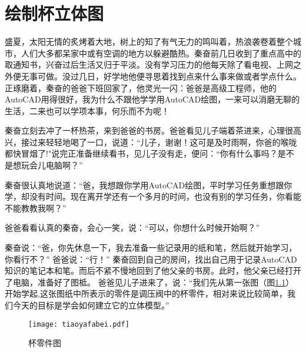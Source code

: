 \chapter{绘制杯立体图}\label{chap:bei}

盛夏，太阳无情的炙烤着大地，树上的知了有气无力的鸣叫着，热浪袭卷着整个城市，人们大多都呆家中或有空调的地方以躲避酷热。秦奋前几日收到了重点高中的取通知书，兴奋过后生活又归于平淡。没有学习压力的他每天除了看电视、上网之外便无事可做。没过几日，好学地他便寻思着找到点来什么事来做或者学点什么。正琢磨着，秦奋的爸爸下班回家了，他灵光一闪：爸爸是高级工程师，他的AutoCAD用得很好，我为什么不跟他学学用AutoCAD绘图，一来可以消磨无聊的生活，二来也可以学项本事，何乐而不为呢！

秦奋立刻去冲了一杯热茶，来到爸爸的书房。爸爸看见儿子端着茶进来，心理很高兴，接过来轻轻地喝了一口，说道：“儿子，谢谢！这可是及时雨啊，你爸的喉咙都快冒烟了!"说完正准备继续看书，见儿子没有走，便问：“你有什么事吗？是不是想玩会儿电脑啊？”

秦奋很认真地说道：“爸，我想跟你学用AutoCAD绘图，平时学习任务重想跟你学，却没有时间。现在离开学还有一个多月的时间，也没有别的学习任务，你看能不能教教我啊？”

爸爸看看认真的秦奋，会心一笑，说：“可以，你想什么时候开始啊？”

秦奋说：“爸，你先休息一下，我去准备一些记录用的纸和笔，然后就开始学习，你看行不？”
爸爸说：“行！”
秦奋回到自己的房间，找出自己用于记录AutoCAD知识的笔记本和笔。而后不紧不慢地回到了他父亲的书房。此时，他父亲已经打开了电脑，准备好了图柢。
爸爸见儿子进来了，说：“我们先从第一张图（图\ref{fig:tiaoyafabei}）开始学起,这张图纸中所表示的零件是调压阀中的杯零件，相对来说比较简单，我们今天的目标是学会如何建立它的立体模型。”


\noindent
\begin{figure}[htbp]
\centering
\texttt{[image: tiaoyafabei.pdf]}
\caption{杯零件图}\label{fig:tiaoyafabei}
\end{figure}
\endinput
